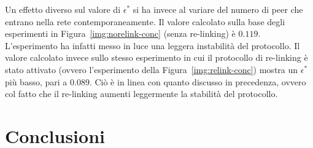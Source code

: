 \documentclass[prodmode,acmtap]{acmlarge}
\begin{document}
Un effetto diverso sul valore di $\epsilon^*$ si ha invece al variare del numero di peer che entrano nella rete contemporaneamente. Il valore calcolato sulla base degli esperimenti in Figura~\ref{img:norelink-conc} (senza re-linking) è $0.119$. L'esperimento ha infatti messo in luce una leggera instabilità del protocollo. Il valore calcolato invece sullo stesso esperimento in cui il protocollo di re-linking è stato attivato (ovvero l'esperimento della Figura~\ref{img:relink-conc}) mostra un $\epsilon^*$ più basso, pari a $0.089$. Ciò è in linea con quanto discusso in precedenza, ovvero col fatto che il re-linking aumenti leggermente la stabilità del protocollo.



\section{Conclusioni} \label{conclusioni}
























\end{document}
